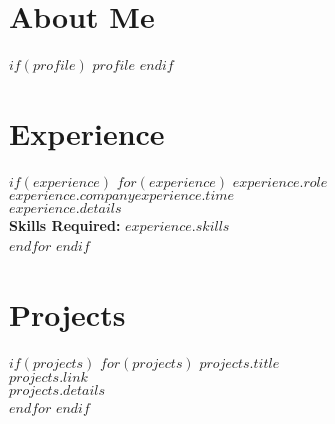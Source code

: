 \documentclass[11pt,oneside,a4paper]{article}
\begin{document}
\begin{tcolorbox}
\begin{minipage}[t]{15cm}
\begin{tcolorbox}[grow to right by=0.6cm,colback=white,colframe=white]
   \section*{About Me}
    $if(profile)$
    $profile$
    $endif$
   \section*{Experience}
    $if(experience)$
     $for(experience)$
      {\bf $experience.role$}\\
      {\underline{$experience.company$}}\hspace{8.5cm}$experience.time$\\
      $experience.details$\\
      {{\bf Skills Required:} $experience.skills$}\\
      
     $endfor$
    $endif$
   
   \section*{Projects}
    $if(projects)$
     $for(projects)$
      {\bf $projects.title$}\\
      $projects.link$\\
      $projects.details$\\
      
     $endfor$
    $endif$

  \end{tcolorbox}
 \end{minipage}
\end{tcolorbox}
\end{document}
